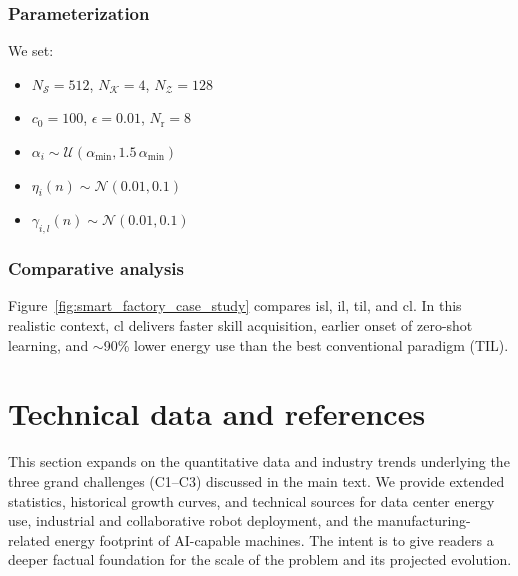\subsubsection{Parameterization}
We set:
\begin{itemize}
    \item $N_\mathcal{S} = 512$, $N_\mathcal{K} = 4$, $N_\mathcal{Z} = 128$
    \item $c_0 = 100$, $\epsilon = 0.01$, $N_\mathrm{r} = 8$
    \item $\alpha_i \sim \mathcal{U}(\alpha_\mathrm{min}, 1.5\,\alpha_\mathrm{min})$
    \item $\eta_i(n) \sim \mathcal{N}(0.01, 0.1)$
    \item $\gamma_{i,l}(n) \sim \mathcal{N}(0.01, 0.1)$
\end{itemize}

\subsubsection{Comparative analysis}
Figure~\ref{fig:smart_factory_case_study} compares \ac{isl}, \ac{il}, \ac{til}, and \ac{cl}. In this realistic context, \ac{cl} delivers faster skill acquisition, earlier onset of zero-shot learning, and $\sim$90\% lower energy use than the best conventional paradigm (TIL).



\newpage
\section{Technical data and references}
This section expands on the quantitative data and industry trends underlying the three grand challenges (C1–C3) discussed in the main text. We provide extended statistics, historical growth curves, and technical sources for data center energy use, industrial and collaborative robot deployment, and the manufacturing-related energy footprint of AI-capable machines. The intent is to give readers a deeper factual foundation for the scale of the problem and its projected evolution.

